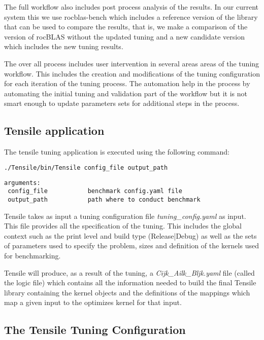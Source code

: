 \documentclass[]{article}
\begin{document}
The full workflow also includes post process analysis of the results. In our current system this we use rocblas-bench which includes a reference version of the library that can be used to compare the results, that is, we make a comparison of the version of rocBLAS without the updated tuning and a new candidate version which includes the new tuning results. 

The over all process includes user intervention in several areas areas of the tuning workflow. This includes the creation and modifications of the tuning configuration for each iteration of the tuning process. The automation help in the process by automating the initial tuning and validation part of the workflow but it is not smart enough to update parameters sets for additional steps in the process.

\subsection{Tensile application}
The tensile tuning application is executed using the following command:

\begin{lstlisting}[language=bash]
./Tensile/bin/Tensile config_file output_path
\end{lstlisting}

\begin{verbatim}
arguments: 
 config_file           benchmark config.yaml file
 output_path           path where to conduct benchmark
\end{verbatim}

Tensile takes as input a tuning configuration file \emph{tuning\_config.yaml} as input. This file provides all the specification of the tuning. This includes the global context such as the print level and build type (Release|Debug) as well as the sets of parameters used to specify the problem, sizes and definition of the kernels used for benchmarking.

Tensile will produce, as a result of the tuning, a \emph{Cijk\_Ailk\_Bljk.yaml} file (called the logic file) which contains all the information needed to build the final Tensile library containing the kernel objects and the definitions of the mappings which map a given input to the optimizes kernel for that input.


\subsection{The Tensile Tuning Configuration}
\end{document}
